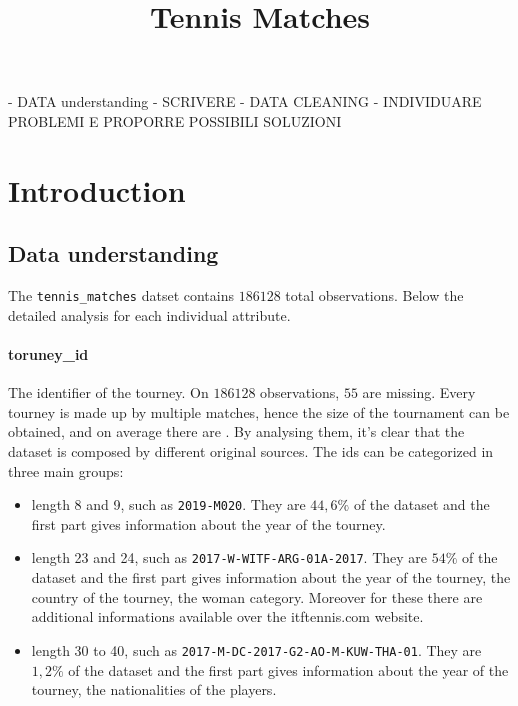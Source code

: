 \documentclass{article}
\title{Tennis Matches}
\begin{document}
\maketitle


- DATA understanding
-   SCRIVERE
- DATA CLEANING
-   INDIVIDUARE PROBLEMI E PROPORRE POSSIBILI SOLUZIONI

\section{Introduction}

\subsection{Data understanding}
The \texttt{tennis\_matches} datset contains $186128$ total observations. Below the detailed analysis for each individual attribute.


\paragraph{toruney\_id}
The identifier of the tourney. On $186128$ observations, $55$ are missing. Every tourney is made up by multiple matches, hence the size of the tournament can be obtained, and on average there are . By analysing them, it's clear that the dataset is composed by different original sources. The ids can be categorized in three main groups:
\begin{itemize}
  \item length 8 and 9, such as \verb|2019-M020|. They are $44,6\%$ of the dataset and the first part gives information about the year of the tourney.
  \item length 23 and 24, such as \verb|2017-W-WITF-ARG-01A-2017|. They are $54\%$ of the dataset and the first part gives information about the year of the tourney, the country of the tourney, the woman category. Moreover for these there are additional informations available over the itftennis.com website. 
  \item length 30 to 40, such as \verb|2017-M-DC-2017-G2-AO-M-KUW-THA-01|. They are $1,2\%$ of the dataset and the first part gives information about the year of the tourney, the nationalities of the players.	
\end{itemize}
\end{document}
